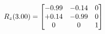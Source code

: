 \documentclass[preview]{standalone}
\begin{document}
\begin{align*}
\special{dvisvgm:raw <g id='unique000'>}R_{z}(3.00) = \begin{bmatrix}-0.99 & -0.14 & 0 \\+0.14 & -0.99 & 0 \\0 & 0 & 1\end{bmatrix}\special{dvisvgm:raw </g>}
\end{align*}
\end{document}
